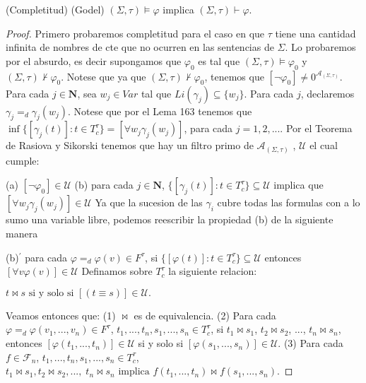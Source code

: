  \begin{theorem}
    (Completitud) (Godel) \((\Sigma ,\tau )\models \varphi \) implica \( (\Sigma ,\tau )\vdash \varphi .\)
  \end{theorem}
  \begin{proof}
    Primero probaremos completitud para el caso en que \(\tau \) tiene una cantidad infinita de nombres de cte que no ocurren en las sentencias de \( \Sigma \). Lo probaremos por el absurdo, es decir supongamos que \(\varphi _{0} \) es tal que \((\Sigma ,\tau )\models \varphi _{0}\) y \((\Sigma ,\tau )\not\vdash \varphi _{0}.\) Notese que ya que \((\Sigma ,\tau )\not\vdash \varphi _{0}\), tenemos que \([\lnot \varphi _{0}]\not=0^{\mathcal{A}_{(\Sigma ,\tau )}}.\) Para cada \(j\in \mathbf{N}\), sea \(w_{j}\in Var\) tal que \( Li(\gamma _{j})\subseteq \{w_{j}\}\). Para cada \(j\), declaremos \(\gamma _{j}=_{d}\gamma _{j}(w_{j})\). Notese que por el Lema 163 tenemos que \(\inf \{[\gamma _{j}(t)]:t\in T_{c}^{\tau }\}=[\forall w_{j}\gamma _{j}(w_{j})]\), para cada \(j=1,2,...\). Por el Teorema de Rasiova y Sikorski tenemos que hay un filtro primo de \(\mathcal{A}_{(\Sigma ,\tau )}\) , \(\mathcal{U}\) el cual cumple:

    (a) \([\lnot \varphi _{0}]\in \mathcal{U}\)
    (b) para cada \(j\in \mathbf{N}\), \(\{[\gamma _{j}(t)]:t\in T_{c}^{\tau }\}\subseteq \mathcal{U}\) implica que \([\forall w_{j}\gamma _{j}(w_{j})]\in \mathcal{U}\)
    Ya que la sucesion de las \(\gamma _{i}\) cubre todas las formulas con a lo sumo una variable libre, podemos reescribir la propiedad (b) de la siguiente manera

    (b)\(^{\prime }\) para cada \(\varphi =_{d}\varphi (v)\in F^{\tau }\), si \(\{[\varphi (t)]:t\in T_{c}^{\tau }\}\subseteq \mathcal{U}\) entonces \( [\forall v\varphi (v)]\in \mathcal{U}\)
    Definamos sobre \(T_{c}^{\tau }\) la siguiente relacion:

    \(\displaystyle t\bowtie s\text{ si y solo si }[(t\equiv s)]\in \mathcal{U}\text{.} \)

    Veamos entonces que:
    (1) \(\bowtie \) es de equivalencia.
    (2) Para cada \(\varphi =_{d}\varphi (v_{1},...,v_{n})\in F^{\tau }\), \( t_{1},...,t_{n},s_{1},...,s_{n}\in T_{c}^{\tau }\), si \(t_{1}\bowtie s_{1}\), \( t_{2}\bowtie s_{2}\), \(...\), \(t_{n}\bowtie s_{n}\), entonces \([\varphi (t_{1},...,t_{n})]\in \mathcal{U}\) si y solo si \([\varphi (s_{1},...,s_{n})]\in \mathcal{U}\).
    (3) Para cada \(f\in \mathcal{F}_{n}\), \( t_{1},...,t_{n},s_{1},...,s_{n}\in T_{c}^{\tau }\),
    \(\displaystyle t_{1}\bowtie s_{1},t_{2}\bowtie s_{2},...,\;t_{n}\bowtie s_{n}\text{ implica }f(t_{1},...,t_{n})\bowtie f(s_{1},...,s_{n}). \)


\end{proof}
